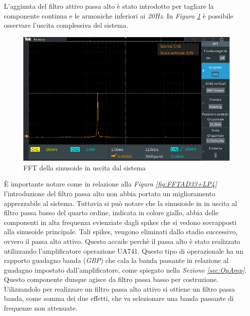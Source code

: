 \documentclass[titlepage]{report}
\begin{document}
	L'aggiunta del filtro attivo passa alto è stato introdotto per tagliare la componente continua e le armoniche inferiori ai \textit{20Hz}.
	In \textit{Figura \ref{fig:FFTfinale}} è possibile osservare l'uscita complessiva del sistema.

	\begin{figure}[H]
		\centering
		\includegraphics[scale = 0.5]{Immagini/ftt_ad633+lp4+hp1_final.PNG}
		\caption{FFT della sinusoide in uscita dal sistema}
		\label{fig:FFTfinale}
	\end{figure}

	È importante notare come in relazione alla \textit{Figura \ref{fig:FFTAD33+LP4}} l'introduzione del filtro passa alto non abbia portato un miglioramento apprezzabile al sistema. Tuttavia si può notare che la sinusioide in in uscita al filtro passa basso del quarto ordine, indicata in colore giallo, abbia delle componenti in alta frequenza evienziate dagli spikes che si vedono sovrapposti alla sinusoide principale. Tali spikes, vengono eliminati dallo stadio successivo, ovvero il passa alto attivo. Questo accade perchè il passa alto è stato realizzato utilizzando l'amplificatore operazione UA741. Questo tipo di operazionale ha un rapporto guadagno banda (\textit{GBP}) che cala la banda passante in relazione al guadagno impostato dall'amplificatore, come spiegato nella \textit{Sezione \ref{sec:OpAmp}}. Questo componente dunque agisce da filtro passa basso per costruzione. Uilizzandolo per realizzare un filtro passa alto attivo si ottiene un filtro passa banda, come somma dei due effetti, che va selezionare una banda passante di frequenze non attenuate.
	 
\end{document}
